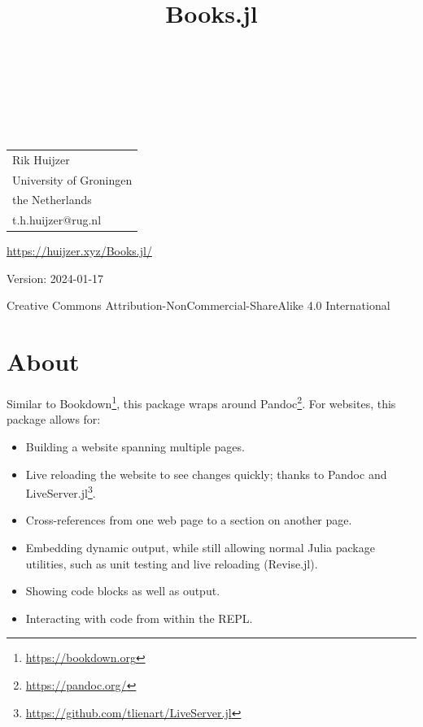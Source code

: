 \documentclass[
  notoc %
]{tufte-book}
\title{Books.jl}
\author{\noindent{Rik Huijzer}\\[3mm] \noindent{and
contributors}\\[3mm] }
\date{}
\DeclareRobustCommand{\href}[2]{#2\footnote{\url{#1}}}
\providecommand{\tightlist}{%
  \setlength{\itemsep}{0pt}\setlength{\parskip}{0pt}
}
\begin{document}
\makeatletter
\thispagestyle{empty}
\vfill
{\Huge\bf
\noindent
\@title
}\\[1in]
{\Large
\noindent
\@author
}
\makeatother

\makeatletter
\newpage
\thispagestyle{empty}
\vfill
{\noindent
\begin{tabular}{l} Rik Huijzer\\ University of Groningen\\ the Netherlands\\ t.h.huijzer@rug.nl\\ \end{tabular}
}
\vfill
{\small
\url{https://huijzer.xyz/Books.jl/}

Version: 2024-01-17

Creative Commons Attribution-NonCommercial-ShareAlike 4.0 International
}
\makeatother


\frontmatter
\mainmatter

\setcounter{tocdepth}{1}
\tableofcontents

\justifying

\setlength{\parindent}{0pt}

\hypertarget{sec:about}{%
\chapter{About}\label{sec:about}}

Similar to \href{https://bookdown.org}{Bookdown}, this package wraps
around \href{https://pandoc.org/}{Pandoc}. For websites, this package
allows for:

\begin{itemize}
\tightlist
\item
  Building a website spanning multiple pages.
\item
  Live reloading the website to see changes quickly; thanks to Pandoc
  and \href{https://github.com/tlienart/LiveServer.jl}{LiveServer.jl}.
\item
  Cross-references from one web page to a section on another page.
\item
  Embedding dynamic output, while still allowing normal Julia package
  utilities, such as unit testing and live reloading (Revise.jl).
\item
  Showing code blocks as well as output.
\item
  Interacting with code from within the REPL.
\end{itemize}
\end{document}
